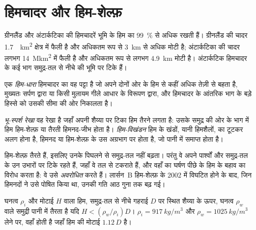 \section{हिमचादर और हिम-शेल्फ़}\label{sec:b3:glaciology:ice-sheets}

ग्रीनलैंड और अंटार्कटिका की हिमचादरें भूमि के हिम का
\qty{99}{\percent} से अधिक रखती हैं। ग्रीनलैंड की चादर \qty{1.7}{\mega
km^2} क्षेत्र में फैली है और अधिकतम रूप से \qty{3}{km} से अधिक मोटी है; अंटार्कटिका की चादर
लगभग \qty{14}{\mega km^2} में फैली है और अधिकतम रूप से लगभग \qty{4.9}{km} मोटी है। अंटार्कटिक हिमचादर के कई भाग
समुद्र-तल से नीचे की भूमि पर टिके हैं।

\begin{definition}[हिम-धारा]\label{def:b3:glaciology:ice-stream}
एक \emph{हिम-धारा} हिमचादर का वह पट्टा है जो अपने दोनों ओर के हिम से
कहीं अधिक तेज़ी से बहता है, मुख्यतः सर्पण द्वारा या
किसी मुलायम गीले आधार के विरूपण द्वारा, और हिमचादर के आंतरिक भाग के बड़े हिस्से को
उसकी सीमा की ओर निकालता है।
\end{definition}

\begin{definition}[भू-स्पर्श रेखा; हिम-विखंडन]\label{def:b3:glaciology:grounding-line}
\emph{भू-स्पर्श रेखा} वह रेखा है जहाँ
अपनी शैय्या पर टिका हिम तैरने लगता है: उसके समुद्र की ओर के भाग में हिम हिम-शेल्फ़ या तैरती हिमनद-जीभ होता है।
\emph{हिम-विखंडन} हिम के खंडों, यानी हिमशैलों, का टूटकर अलग होना है,
हिमनद या हिम-शेल्फ़ के उस अग्रभाग पर होता है,
जो पानी में समाप्त होता है।
\end{definition}

हिम-शेल्फ़ तैरते हैं, इसलिए उनके पिघलने से समुद्र-तल नहीं बढ़ता। परंतु वे
अपने पार्श्वों और समुद्र-तल के उन उभारों पर टिके रहते हैं, जहाँ वे
तल से टकराते हैं, और वहाँ का घर्षण पीछे के हिम के बहाव का विरोध करता है:
वे उसे \emph{अवरोधित} करते हैं। लार्सन~B हिम-शेल्फ़ के 2002 में विघटित होने के बाद,
जिन हिमनदों ने उसे पोषित किया था, उनकी गति आठ गुना तक बढ़ गई।

\begin{proposition}[उत्प्लावन]\label{prop:b3:glaciology:flotation}
घनत्व $\rho_i$ और मोटाई $H$ वाला हिम, समुद्र-तल से नीचे गहराई $D$ पर स्थित शैय्या के ऊपर,
घनत्व $\rho_w$ वाले समुद्री पानी में तैरता है यदि $H < (\rho_w/\rho_i)D$।
$\rho_i = \qty{917}{kg/m^3}$ और $\rho_w = \qty{1025}{kg/m^3}$ लेने पर,
 वहाँ होती है जहाँ हिम की मोटाई $1.12\,D$ है।
\end{proposition}

